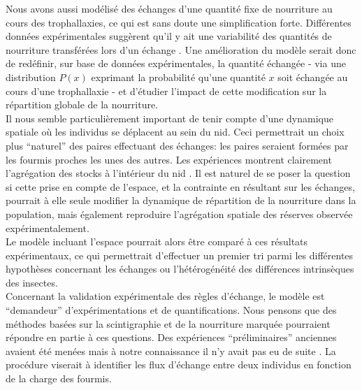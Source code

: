 Nous avons aussi modélisé des échanges d'une quantité fixe de nourriture au cours des trophallaxies, ce qui est sans doute une simplification forte. Différentes données expérimentales suggèrent qu'il y ait une variabilité des quantités de nourriture transférées lors d'un échange \citep{}. Une amélioration du modèle serait donc de redéfinir, sur base de données expérimentales, la quantité échangée - via une distribution $P(x)$ exprimant la probabilité qu'une quantité $x$ soit échangée au cours d'une trophallaxie - et d'étudier l'impact de cette modification sur la répartition globale de la nourriture.\\

Il nous semble particulièrement important de tenir compte d'une dynamique spatiale où les individus se déplacent au sein du nid. Ceci permettrait un choix plus ``naturel'' des paires effectuant des échanges: les paires seraient formées par les fourmis proches les unes des autres. Les expériences montrent clairement l'agrégation des stocks à l'intérieur du nid \citep{buffin_feeding_2009}. Il est naturel de se poser la question si cette prise en compte de l'espace, et la contrainte en résultant sur les échanges, pourrait à elle seule modifier la dynamique de répartition de la nourriture 	dans la population, mais également reproduire l'agrégation spatiale des réserves observée expérimentalement.\\

Le modèle incluant l'espace pourrait alors être comparé à ces résultats expérimentaux, ce qui permettrait d'effectuer un premier tri parmi les différentes hypothèses concernant les échanges ou l'hétérogénéité des différences intrinsèques des insectes. \\


Concernant la validation expérimentale des règles d'échange, le modèle est ``demandeur'' d'expérimentations et de quantifications. Nous pensons que des méthodes basées sur la scintigraphie et de la nourriture marquée pourraient répondre en partie à ces questions. Des expériences ``préliminaires'' anciennes avaient été menées mais à notre connaissance il n'y avait pas eu de suite \citep{bonavita-cougourdan_nouvelle_1979}. La procédure viserait à identifier les flux d'échange entre deux individus en fonction de la charge des fourmis.\\



%

